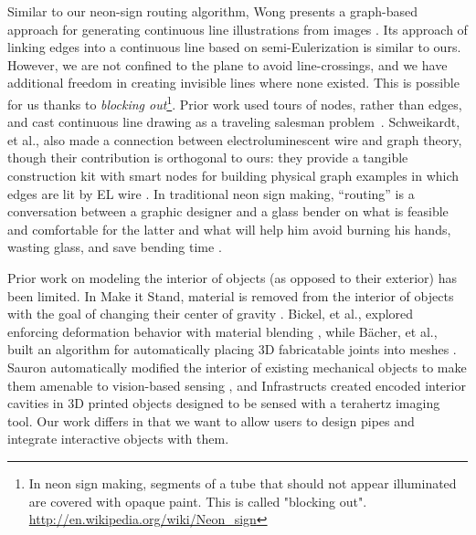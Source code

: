 Similar to our neon-sign routing algorithm, Wong presents a graph-based approach for generating continuous line illustrations from images \cite{Wong-continuousline}. Its approach of linking edges into a continuous line based on semi-Eulerization is similar to ours.  However, we are not confined to the plane to avoid line-crossings, and we have additional freedom in creating invisible lines where none existed.  This is possible for us thanks to \emph{blocking out}\footnote{In neon sign making, segments of a tube that should not appear illuminated are covered with opaque paint. This is called "blocking out". \url{http://en.wikipedia.org/wiki/Neon_sign}}. Prior work used tours of nodes, rather than edges, and cast continuous line drawing as a traveling salesman problem~\cite{Bosch-tsp}.  Schweikardt, et al., also made a connection between electroluminescent wire and graph theory, though their contribution is orthogonal to ours: they provide a tangible construction kit with smart nodes for building physical graph examples in which edges are lit by EL wire \cite{Schweikardt-tei09}.  In traditional neon sign making, ``routing'' is a conversation between a graphic designer and a glass bender on what is feasible and comfortable for the latter and what will help him avoid burning his hands, wasting glass, and save bending time \cite{strattman1997neon}.

Prior work on modeling the interior of objects (as opposed to their exterior) has been limited.  In Make it Stand, material is removed from the interior of objects with the goal of changing their center of gravity \cite{Prevost-makeitstand}.  Bickel, et al., explored enforcing deformation behavior with material blending \cite{Bickel-deformation}, while B\"{a}cher, et al., built an algorithm for automatically placing 3D fabricatable joints into meshes \cite{Bacher-articulated}.  Sauron automatically modified the interior of existing mechanical objects to make them amenable to vision-based sensing \cite{Savage-sauron}, and Infrastructs created encoded interior cavities in 3D printed objects designed to be sensed with a terahertz imaging tool.  Our work differs in that we want to allow users to design pipes and integrate interactive objects with them.